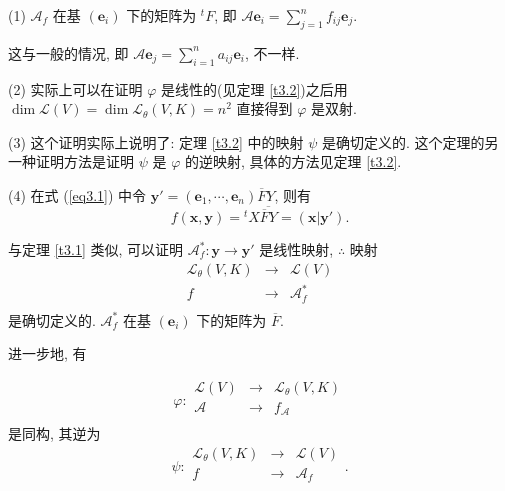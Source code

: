 \documentclass{ctexart}
\begin{document}
\begin{note}
    (1) $\mathcal{A}_f$ 在基 $(\boldsymbol{e}_i)$ 下的矩阵为 ${}^tF$, 即 $\mathcal{A}\boldsymbol{e}_i=\sum\limits_{j=1}^nf_{ij}\boldsymbol{e}_j$.

    这与一般的情况, 即 $\mathcal{A}\boldsymbol{e}_j=\sum\limits_{i=1}^na_{ij}\boldsymbol{e}_i$, 不一样.

    (2) 实际上可以在证明 $\varphi$ 是线性的(见定理 \ref{t3.2})之后用 $\dim\mathcal{L}(V)=\dim\mathcal{L}_\theta(V,K)=n^2$ 直接得到 $\varphi$ 是双射.

    (3) 这个证明实际上说明了: 定理 \ref{t3.2} 中的映射 $\psi$ 是确切定义的. 这个定理的另一种证明方法是证明 $\psi$ 是 $\varphi$ 的逆映射, 具体的方法见定理 \ref{t3.2}.

    (4) 在式 (\ref{eq3.1}) 中令 $\boldsymbol{y}'=(\boldsymbol{e}_1,\cdots,\boldsymbol{e}_n)\overline{F}Y$, 则有
    \[f(\boldsymbol{x},\boldsymbol{y})={}^tX\overline{\overline{F}Y}=(\boldsymbol{x}|\boldsymbol{y}').\]

    与定理 \ref{t3.1} 类似, 可以证明 $\mathcal{A}^*_f:\boldsymbol{y}\to\boldsymbol{y}'$ 是线性映射, $\therefore$ 映射
    \[\begin{array}{rcl}
        \mathcal{L}_\theta(V,K) & \to & \mathcal{L}(V) \\
        f & \to & \mathcal{A}^*_f \\
    \end{array}\]
    是确切定义的. $\mathcal{A}^*_f$ 在基 $(\boldsymbol{e}_i)$ 下的矩阵为 $\overline{F}$.
\end{note}
进一步地, 有
\begin{theorem}\label{t3.2}
    \[\varphi:\begin{array}{rcl}
        \mathcal{L}(V) & \to & \mathcal{L}_\theta(V,K) \\
        \mathcal{A} & \to & f_\mathcal{A} \\
    \end{array}\]
    是同构, 其逆为
    \[\psi:\begin{array}{rcl}
        \mathcal{L}_\theta(V,K) & \to & \mathcal{L}(V) \\
        f & \to & \mathcal{A}_f \\
    \end{array}.\]
\end{theorem}
\end{document}

